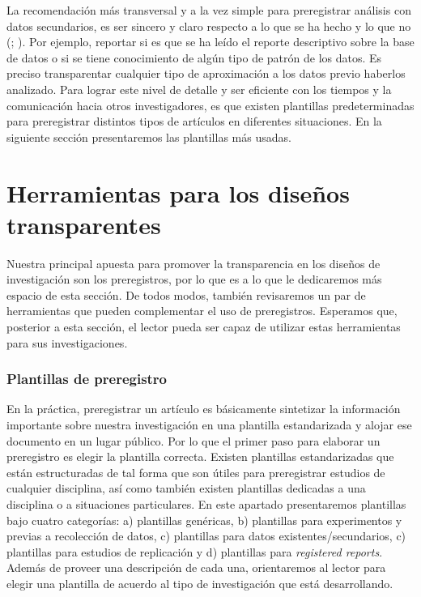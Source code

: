 \documentclass[
  spanish,
  a4paper,
  oneside]{scrbook}
\begin{document}
La recomendación más transversal y a la vez simple para preregistrar
análisis con datos secundarios, es ser sincero y claro respecto a lo que
se ha hecho y lo que no (; ). Por ejemplo, reportar si es que se ha leído el reporte
descriptivo sobre la base de datos o si se tiene conocimiento de algún
tipo de patrón de los datos. Es preciso transparentar cualquier tipo de
aproximación a los datos previo haberlos analizado. Para lograr este
nivel de detalle y ser eficiente con los tiempos y la comunicación hacia
otros investigadores, es que existen plantillas predeterminadas para
preregistrar distintos tipos de artículos en diferentes situaciones. En
la siguiente sección presentaremos las plantillas más usadas.

\chapter{Herramientas para los diseños
transparentes}\label{herramientas-para-los-diseuxf1os-transparentes}

Nuestra principal apuesta para promover la transparencia en los diseños
de investigación son los preregistros, por lo que es a lo que le
dedicaremos más espacio de esta sección. De todos modos, también
revisaremos un par de herramientas que pueden complementar el uso de
preregistros. Esperamos que, posterior a esta sección, el lector pueda
ser capaz de utilizar estas herramientas para sus investigaciones.

\subsection{Plantillas de preregistro}\label{plantillas-de-preregistro}

En la práctica, preregistrar un artículo es básicamente sintetizar la
información importante sobre nuestra investigación en una plantilla
estandarizada y alojar ese documento en un lugar público. Por lo que el
primer paso para elaborar un preregistro es elegir la plantilla
correcta. Existen plantillas estandarizadas que están estructuradas de
tal forma que son útiles para preregistrar estudios de cualquier
disciplina, así como también existen plantillas dedicadas a una
disciplina o a situaciones particulares. En este apartado presentaremos
plantillas bajo cuatro categorías: a) plantillas genéricas, b)
plantillas para experimentos y previas a recolección de datos, c)
plantillas para datos existentes/secundarios, c) plantillas para
estudios de replicación y d) plantillas para \emph{registered reports}.
Además de proveer una descripción de cada una, orientaremos al lector
para elegir una plantilla de acuerdo al tipo de investigación que está
desarrollando.
\end{document}
